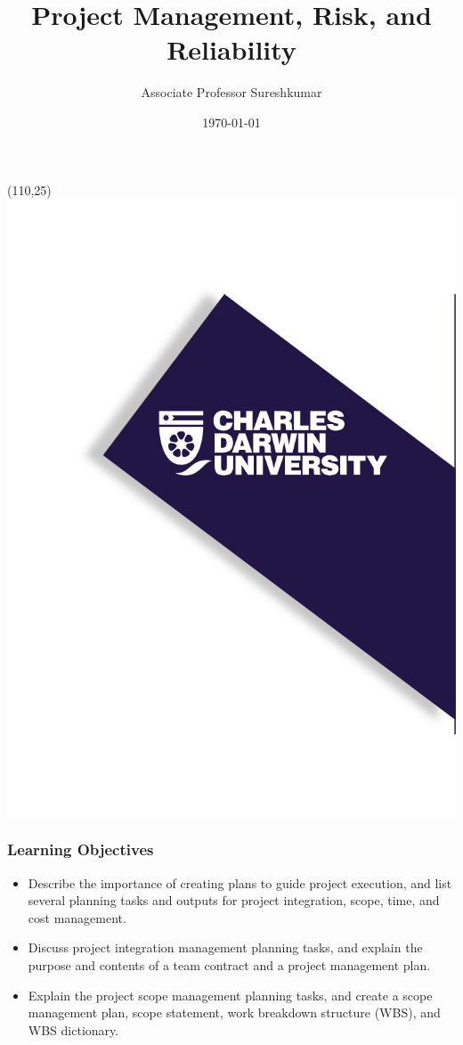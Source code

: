\documentclass[aspectratio=169]{beamer}
\title[PRT551 - Lecture 4]{Project Management, Risk, and Reliability} %
\author{Associate Professor Sureshkumar} %
\institute[CDU] %
{
Charles Darwin University \\ %
\medskip
\textit{cdux@cdu.edu.au} %
}
\date{\today} %
\begin{document}
\begin{frame}
\titlepage %
\begin{textblock}{20}(110,25)
      \includegraphics[scale=0.8]{logo_1.png}
\end{textblock}
\end{frame}





\begin{frame}
\frametitle{Learning Objectives}
\begin{itemize}
\item Describe the importance of creating plans to guide project execution, and list several planning tasks and outputs for project integration, scope, time, and cost management.
\vspace{0.3cm}
\item Discuss project integration management planning tasks, and explain the purpose and contents of a team contract and a project management plan.
\vspace{0.3cm}
\item Explain the project scope management planning tasks, and create a scope management plan, scope statement, work breakdown structure (WBS), and WBS dictionary.
\end{itemize}
\end{frame}
\end{document}
